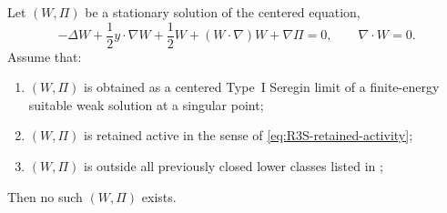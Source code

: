 \begin{theorem}
\label{thm:R3S-no-active-stationary-carrier}
Let \((W,\Pi)\) be a stationary solution of the centered equation,
\begin{equation}\label{eq:R3S-stationary-centered}
   -\Delta W+\frac12 y\cdot\nabla W+\frac12 W
   +(W\cdot\nabla)W+\nabla\Pi=0,
   \qquad \nabla\cdot W=0 .
\end{equation}
Assume that:
\begin{enumerate}[label=(\roman*)]
   \item \((W,\Pi)\) is obtained as a centered Type~I Seregin limit of a
   finite-energy suitable weak solution at a singular point;
   \item \((W,\Pi)\) is retained active in the sense of
   \eqref{eq:R3S-retained-activity};
   \item \((W,\Pi)\) is outside all previously closed lower classes listed in
   ;
\end{enumerate}
Then no such \((W,\Pi)\) exists.
\end{theorem}

